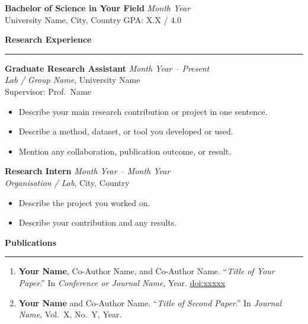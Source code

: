 \documentclass[11pt, a4paper]{article}
\newcommand{\cvsection}[1]{%
  \vspace{10pt}%
  {\large \textbf{#1}}%
  \vspace{3pt}%
  \hrule                        %
  \vspace{6pt}%
}
\begin{document}
\textbf{Bachelor of Science in Your Field} \hfill \textit{Month Year} \\{}
University Name, City, Country \quad GPA: X.X / 4.0


\cvsection{Research Experience}

\textbf{Graduate Research Assistant} \hfill \textit{Month Year -- Present} \\
\textit{Lab / Group Name}, University Name \\
Supervisor: Prof.\ Name


\begin{itemize}
  \setlength{\itemsep}{2pt}   %
  \item Describe your main research contribution or project in one sentence.
  \item Describe a method, dataset, or tool you developed or used.
  \item Mention any collaboration, publication outcome, or result.
\end{itemize}

\vspace{8pt}

\textbf{Research Intern} \hfill \textit{Month Year -- Month Year} \\
\textit{Organisation / Lab}, City, Country

\begin{itemize}
  \setlength{\itemsep}{2pt}
  \item Describe the project you worked on.
  \item Describe your contribution and any results.
\end{itemize}


\cvsection{Publications}

\begin{enumerate}
  \setlength{\itemsep}{4pt}

  \item \textbf{Your Name}, Co-Author Name, and Co-Author Name.
        ``\textit{Title of Your Paper}.''
        In \textit{Conference or Journal Name}, Year.
        \href{https://doi.org/xxxxx}{doi:xxxxx}

  \item \textbf{Your Name} and Co-Author Name.
        ``\textit{Title of Second Paper}.''
        In \textit{Journal Name}, Vol.\ X, No.\ Y, Year.

\end{enumerate}
\end{document}
